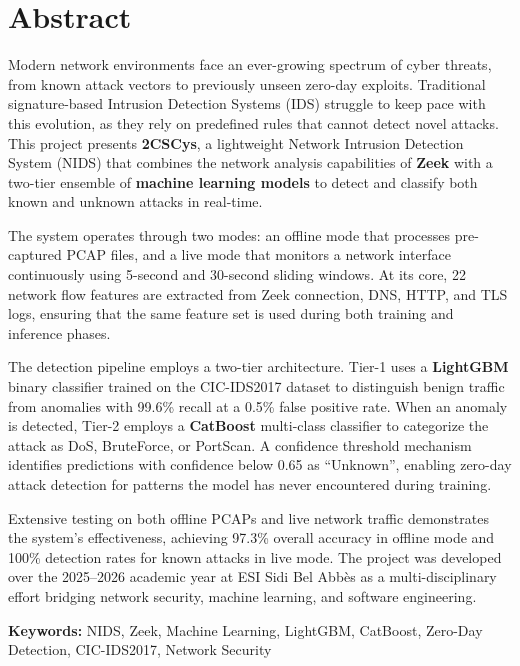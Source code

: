 \documentclass[12pt,a4paper,twoside]{report}
\begin{document}
\chapter*{Abstract}

Modern network environments face an ever-growing spectrum of cyber threats, from known attack vectors to previously unseen zero-day exploits. Traditional signature-based Intrusion Detection Systems (IDS) struggle to keep pace with this evolution, as they rely on predefined rules that cannot detect novel attacks. This project presents \textbf{2CSCys}, a lightweight Network Intrusion Detection System (NIDS) that combines the network analysis capabilities of \textbf{Zeek} with a two-tier ensemble of \textbf{machine learning models} to detect and classify both known and unknown attacks in real-time.

The system operates through two modes: an offline mode that processes pre-captured PCAP files, and a live mode that monitors a network interface continuously using 5-second and 30-second sliding windows. At its core, 22 network flow features are extracted from Zeek connection, DNS, HTTP, and TLS logs, ensuring that the same feature set is used during both training and inference phases.

The detection pipeline employs a two-tier architecture. Tier-1 uses a \textbf{LightGBM} binary classifier trained on the CIC-IDS2017 dataset to distinguish benign traffic from anomalies with 99.6\% recall at a 0.5\% false positive rate. When an anomaly is detected, Tier-2 employs a \textbf{CatBoost} multi-class classifier to categorize the attack as DoS, BruteForce, or PortScan. A confidence threshold mechanism identifies predictions with confidence below 0.65 as ``Unknown'', enabling zero-day attack detection for patterns the model has never encountered during training.

Extensive testing on both offline PCAPs and live network traffic demonstrates the system's effectiveness, achieving 97.3\% overall accuracy in offline mode and 100\% detection rates for known attacks in live mode. The project was developed over the 2025--2026 academic year at ESI Sidi Bel Abbès as a multi-disciplinary effort bridging network security, machine learning, and software engineering.

\vspace{10pt}
\noindent\textbf{Keywords:} NIDS, Zeek, Machine Learning, LightGBM, CatBoost, Zero-Day Detection, CIC-IDS2017, Network Security
\end{document}
